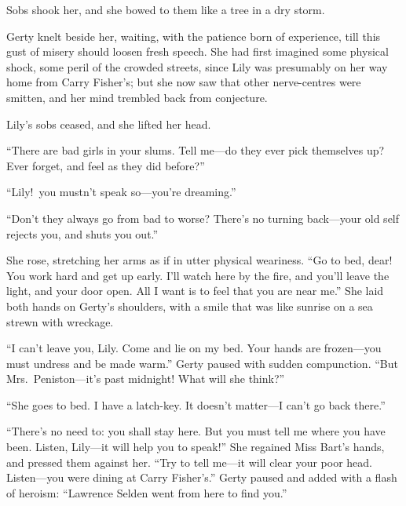 \documentclass[12pt,a4paper]{book}
\begin{document}
Sobs shook her, and she bowed to them like a tree in a dry storm.





Gerty knelt beside her, waiting, with the patience born of
experience, till this gust of misery should loosen fresh speech. 
She had first imagined some physical shock, some peril of the
crowded streets, since Lily was presumably on her way home from
Carry Fisher's; but she now saw that other nerve-centres were
smitten, and her mind trembled back from conjecture.





Lily's sobs ceased, and she lifted her head.





``There are bad girls in your slums. Tell me---do they ever pick
themselves up? Ever forget, and feel as they did before?''





``Lily!\ you mustn't speak so---you're dreaming.''





``Don't they always go from bad to worse? There's no turning
back---your old self rejects you, and shuts you out.''





She rose, stretching her arms as if in utter physical weariness. 
``Go to bed, dear! You work hard and get up early. I'll watch here
by the fire, and you'll leave the light, and your door open. All
I want is to feel that you are near me.'' She laid both hands on
Gerty's shoulders, with a smile that was like sunrise on a sea
strewn with wreckage.





``I can't leave you, Lily. Come and lie on my bed. Your hands are
frozen---you must undress and be made warm.'' Gerty paused with
sudden compunction. ``But Mrs.\ Peniston---it's past midnight! What
will she think?''





``She goes to bed. I have a latch-key. It doesn't matter---I can't
go back there.''





``There's no need to: you shall stay here. But you must tell me
where you have been. Listen, Lily---it will help you to speak!''
She regained Miss Bart's hands, and pressed them against her. 
``Try to tell me---it will clear your poor head. Listen---you were
dining at Carry Fisher's.'' Gerty paused and added with a flash of
heroism: ``Lawrence Selden went from here to find you.''
\end{document}
